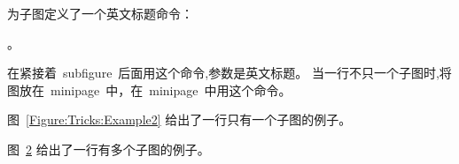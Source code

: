 为子图定义了一个英文标题命令：
\begin{verb}
。
\end{verb}
在紧接着~subfigure~后面用这个命令,参数是英文标题。
当一行不只一个子图时,将图放在~minipage~中，在~minipage~中用这个命令。

图~\ref{Figure:Tricks:Example2} 给出了一行只有一个子图的例子。

图~\ref{Figure:Tricks:Example3} 给出了一行有多个子图的例子。

\begin{figure}[htbp]
\centering
\begin{minipage}{0.40\textwidth}
\centering
{}
\end{minipage} 

\begin{minipage}{0.40\textwidth} %
\centering
{}
\end{minipage}
\label{Figure:Tricks:Example2222}
\end{figure}

\begin{figure}[htbp]
\centering
\begin{minipage}{0.25\textwidth}
\centering
{}\vspace*{-5pt}
\end{minipage}
\begin{minipage}{0.25\textwidth}
\centering
{}\vspace*{-5pt}
\end{minipage}
\begin{minipage}{0.25\textwidth}
\centering
{}\vspace*{-5pt}
\end{minipage}
\label{Figure:Tricks:Example3}
\end{figure}

